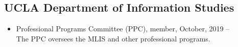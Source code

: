 
\subsection{UCLA Department of Information Studies}
\begin{itemize}[label={},leftmargin=!,labelindent=5pt,itemindent=-15pt]
  \item Professional Programs Committee (PPC), member, October, 2019 --  \\ The PPC oversees the MLIS and other professional programs.
\end{itemize}
